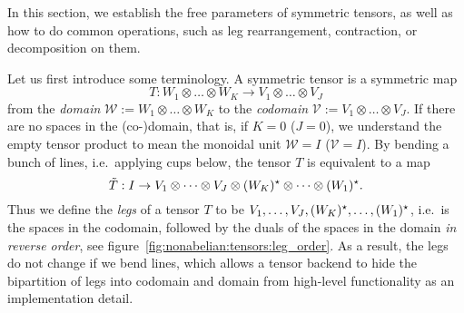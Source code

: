 In this section, we establish the free parameters of symmetric tensors, as well as how to do common operations, such as leg rearrangement, contraction, or decomposition on them.
%

Let us first introduce some terminology.
%
A symmetric tensor is a symmetric map
%
\begin{equation}
    T : W_1 \otimes \dots \otimes W_K \to V_1 \otimes \dots \otimes V_J
\end{equation}
%
from the \emph{domain} $\mathcal{W} := W_1 \otimes \dots \otimes W_K$ to the \emph{codomain} $\mathcal{V} := V_1 \otimes \dots \otimes V_J$.
%
If there are no spaces in the (co-)domain, that is, if $K=0$ ($J=0$), we understand the empty tensor product to mean the monoidal unit $\mathcal{W} = I$ ($\mathcal{V} = I$).
%
By bending a bunch of lines, i.e.~applying cups below, the tensor $T$ is equivalent to a map
\begin{equation}
    \tilde T : I \to V_1 \otimes \dots \otimes V_J \otimes (W_K)^\star \otimes \dots \otimes (W_1)^\star
    .
\end{equation}
%
Thus we define the \emph{legs} of a tensor $T$ to be $V_1, \dots, V_J, (W_K)^\star, \dots,(W_1)^\star$, i.e.~is the spaces in the codomain, followed by the duals of the spaces in the domain \emph{in reverse order}, see figure~\ref{fig:nonabelian:tensors:leg_order}.
%
As a result, the legs do not change if we bend lines, which allows a tensor backend to hide the bipartition of legs into codomain and domain from high-level functionality as an implementation detail.

